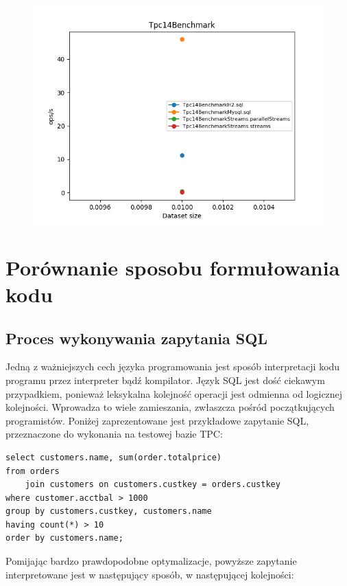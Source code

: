 \documentclass[12pt]{extarticle}
\begin{document}
\begin{figure}[H]
\centering
\includegraphics[width=13cm]{plots/Tpc14Benchmark}
\end{figure}


\section{Porównanie sposobu formułowania kodu}

\subsection{Proces wykonywania zapytania SQL}

    Jedną z ważniejszych cech języka programowania jest sposób interpretacji kodu programu przez interpreter bądź kompilator. Język SQL jest dość ciekawym przypadkiem, ponieważ leksykalna kolejność operacji jest odmienna od logicznej kolejności. Wprowadza to wiele zamieszania, zwłaszcza pośród początkujących programistów. Poniżej zaprezentowane jest przykładowe zapytanie SQL, przeznaczone do wykonania na testowej bazie TPC:


\begin{lstlisting}[label=sqlorder, caption=Przykład kolejności wykonywania zapytania SQL]
select customers.name, sum(order.totalprice)
from orders 
    join customers on customers.custkey = orders.custkey
where customer.acctbal > 1000
group by customers.custkey, customers.name
having count(*) > 10
order by customers.name;
\end{lstlisting}

Pomijając bardzo prawdopodobne optymalizacje, powyższe zapytanie interpretowane jest w następujący sposób, w następującej kolejności:
\end{document}

